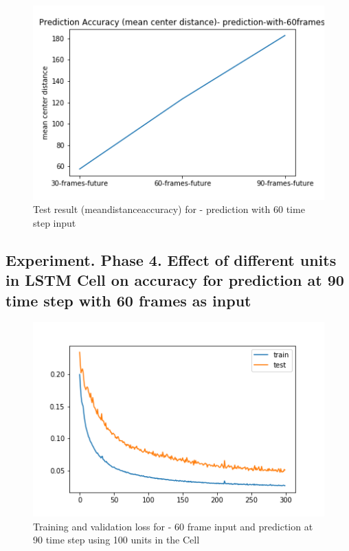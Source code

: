 \begin{figure}[H] 
\includegraphics[scale=0.7]{prediction-with-60frames-mean_distance_accuracy}
\begin{center}
\caption{Test result (mean\textunderscore distance\textunderscore accuracy) for - prediction with 60 time step
 input }
\label{60-mcd}
\end{center}
\end{figure}

\subsection{Experiment. Phase 4. Effect of different units in LSTM Cell on accuracy for prediction at 90 time step with 60 frames as input}

\begin{figure}[H] 
\includegraphics[scale=0.7]{conf14_300e_60_90ffuture_100unit}
\begin{center}
\caption{Training and validation loss for - 60 frame input and prediction at 90 time step using 100 units in the Cell}
\label{60-90-100unit}
\end{center}
\end{figure}

